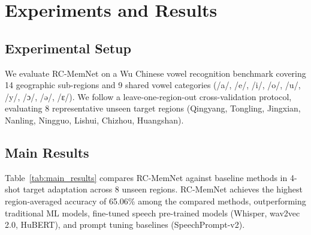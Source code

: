 \documentclass[letterpaper]{article} %
\begin{document}
\section{Experiments and Results}

\subsection{Experimental Setup}
We evaluate RC-MemNet on a Wu Chinese vowel recognition benchmark covering 14 geographic sub-regions and 9 shared vowel categories (/a/, /e/, /i/, /o/, /u/, /y/, /ɔ/, /ə/, /ɛ/). We follow a leave-one-region-out cross-validation protocol, evaluating 8 representative unseen target regions (Qingyang, Tongling, Jingxian, Nanling, Ningguo, Lishui, Chizhou, Huangshan).

\subsection{Main Results}
Table~\ref{tab:main_results} compares RC-MemNet against baseline methods in 4-shot target adaptation across 8 unseen regions. RC-MemNet achieves the highest region-averaged accuracy of 65.06\% among the compared methods, outperforming traditional ML models, fine-tuned speech pre-trained models (Whisper, wav2vec 2.0, HuBERT), and prompt tuning baselines (SpeechPrompt-v2).

\begin{table}[t]
\centering
\caption{Cross-regional Wu vowel recognition Accuracy (\%) under 4-shot target adaptation across 8 unseen regions.}
\label{tab:main_results}
\end{table}
\end{document}
